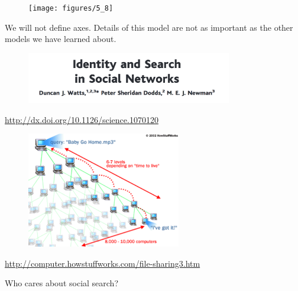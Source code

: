 \documentclass[aspectratio=169]{beamer}
\begin{document}
\begin{frame}

\begin{figure}
  \centering
  \texttt{[image: figures/5\_8]}
\end{figure}

We will not define axes. Details of this model are not as important as the other models we have learned about.


\end{frame}
\begin{frame}

\begin{figure}
  \centering
  \includegraphics[width=0.8\textwidth]{figures/watts_identity_2002_title}
\end{figure}

\vfill

\url{http://dx.doi.org/10.1126/science.1070120}


\end{frame}
\begin{frame}

\begin{figure}
  \centering
  \includegraphics[width=0.6\textwidth]{figures/how_gnutella_works}
\end{figure}

\tiny{\url{http://computer.howstuffworks.com/file-sharing3.htm}}


\end{frame}
\begin{frame}

Who cares about social search?

\end{frame}
\end{document}
